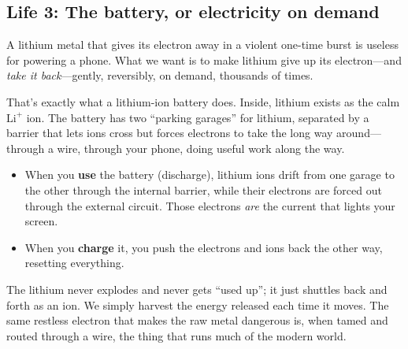 \documentclass[11pt, letterpaper]{article}
\newcommand{\Lip}{\text{Li}^{+}}
\begin{document}
\subsection{Life 3: The battery, or electricity on demand}

A lithium metal that gives its electron away in a violent one-time burst is useless for powering a phone. What we want is to make lithium give up its electron---and \textit{take it back}---gently, reversibly, on demand, thousands of times.

That's exactly what a lithium-ion battery does. Inside, lithium exists as the calm $\Lip$ ion. The battery has two ``parking garages'' for lithium, separated by a barrier that lets ions cross but forces electrons to take the long way around---through a wire, through your phone, doing useful work along the way.

\begin{itemize}[nosep]
  \item When you \textbf{use} the battery (discharge), lithium ions drift from one garage to the other through the internal barrier, while their electrons are forced out through the external circuit. Those electrons \textit{are} the current that lights your screen.
  \item When you \textbf{charge} it, you push the electrons and ions back the other way, resetting everything.
\end{itemize}

The lithium never explodes and never gets ``used up''; it just shuttles back and forth as an ion. We simply harvest the energy released each time it moves. The same restless electron that makes the raw metal dangerous is, when tamed and routed through a wire, the thing that runs much of the modern world.

\end{document}
